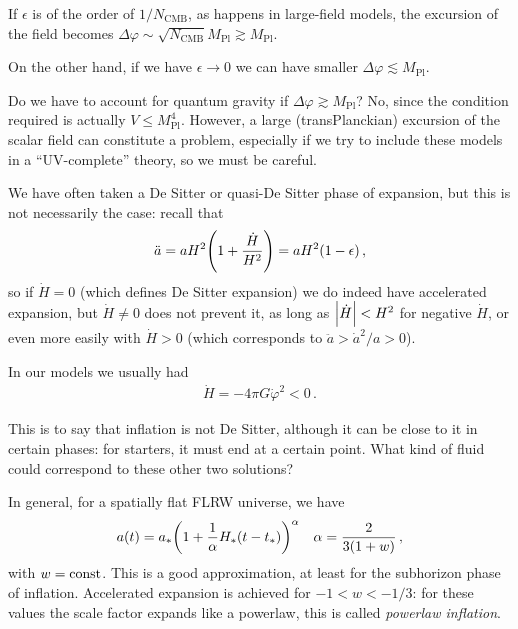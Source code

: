 \documentclass[main.tex]{subfiles}
\begin{document}
If \(\epsilon \) is of the order of \(1 / N _{\text{CMB}}\), as happens in large-field models, the excursion of the field becomes \(\Delta \varphi \sim \sqrt{N _{\text{CMB}}} M _{\text{Pl}} \gtrsim M _{\text{Pl}}\).



On the other hand, if we have \(\epsilon \to 0\) we can have smaller \(\Delta \varphi \lesssim M _{\text{Pl}}\). 

Do we have to account for quantum gravity if \(\Delta \varphi \gtrsim M _{\text{Pl}}\)? No, since the condition required is actually \(V \leq M _{\text{Pl}}^{4}\).
However, a large (transPlanckian) excursion of the scalar field can constitute a problem, especially if we try to include these models in a ``UV-complete'' theory, so we must be careful.

We have often taken a De Sitter or quasi-De Sitter phase of expansion, but this is not necessarily the case: recall that 
%
\begin{align}
\ddot{a} = a H^2 \qty(1 + \frac{\dot{H}}{H^2}) = a H^2 \qty(1 - \epsilon )
\,,
\end{align}
%
so if \(\dot{H} = 0\) (which defines De Sitter expansion) we do indeed have accelerated expansion, but \(\dot{H} \neq 0 \) does not prevent it, as long as \(\abs{\dot{H}} < H^2\) for negative \(\dot{H}\), or even more easily with \(\dot{H} > 0\) (which corresponds to \(\ddot{a} > \dot{a}^2 / a  > 0\)). 

In our models we usually had 
%
\begin{align} \label{eq:derivative-Hubble-parameter-scalar-field}
\dot{H} = - 4 \pi G \dot{\varphi}^2 < 0
\,.
\end{align}

This is to say that inflation is not De Sitter, although it can be close to it in certain phases: for starters, it must end at a certain point. 
What kind of fluid could correspond to these other two solutions? 

In general, for a spatially flat FLRW universe, we have 
%
\begin{align}
a(t) = a_* \qty(1 + \frac{1}{\alpha } H_*(t- t_*))^{\alpha }
&& \alpha = \frac{2}{3 (1+w)}
\,,
\end{align}
%
with \(w = \text{const}\). This is a good approximation, at least for the subhorizon phase of inflation.
Accelerated expansion is achieved for \(-1 < w < - 1/3\): for these values the scale factor expands like a powerlaw, this is called \emph{powerlaw inflation}. 
\end{document}
